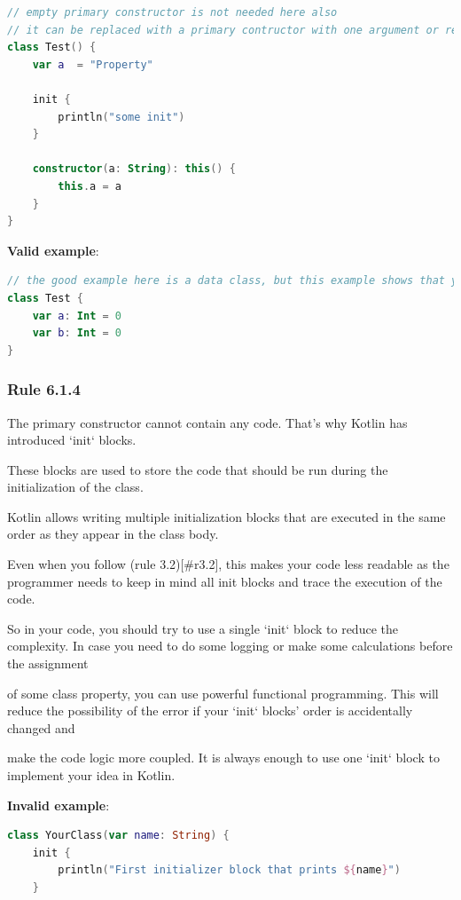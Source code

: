 {{{{\begin{lstlisting}[language=Kotlin]
// empty primary constructor is not needed here also
// it can be replaced with a primary contructor with one argument or removed
class Test() {
    var a  = "Property"

    init {
        println("some init")
    }

    constructor(a: String): this() {
        this.a = a
    }
}
\end{lstlisting}


\textbf{Valid example}:

\begin{lstlisting}[language=Kotlin]
// the good example here is a data class, but this example shows that you should get rid of braces for primary constructor
class Test {
    var a: Int = 0
    var b: Int = 0
}
\end{lstlisting}


\subsubsection*{\textbf{Rule 6.1.4}}
\leavevmode\newline

The primary constructor cannot contain any code. That's why Kotlin has introduced `init` blocks.

These blocks are used to store the code that should be run during the initialization of the class.

Kotlin allows writing multiple initialization blocks that are executed in the same order as they appear in the class body.

Even when you follow (rule 3.2)[\#r3.2], this makes your code less readable as the programmer needs to keep in mind all init blocks and trace the execution of the code.

So in your code, you should try to use a single `init` block to reduce the complexity. In case you need to do some logging or make some calculations before the assignment

of some class property, you can use powerful functional programming. This will reduce the possibility of the error if your `init` blocks' order is accidentally changed and

make the code logic more coupled. It is always enough to use one `init` block to implement your idea in Kotlin.



\textbf{Invalid example}:

\begin{lstlisting}[language=Kotlin]
class YourClass(var name: String) {
    init {
        println("First initializer block that prints ${name}")
    }


\end{lstlisting}}}}}
